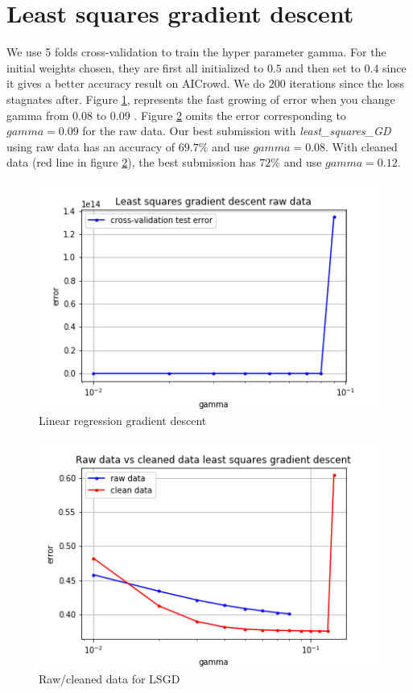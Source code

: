 \documentclass[11pt, a4paper, twocolumn]{article}
\begin{document}
\section{Least squares gradient descent}
We use 5 folds cross-validation
to train the hyper parameter gamma.
For the initial weights chosen, they are first all initialized to $0.5$ and then set to $0.4$ 
since it gives a better accuracy result on AICrowd.
We do $200$ iterations since the loss stagnates after.
Figure \ref{fig:lsgd}, 
represents the fast growing of error 
when you change gamma from $0.08$ to $0.09$ .
Figure \ref{fig:raw_clean_lsgd} omits the error corresponding to $gamma = 0.09$ for the raw data.
Our best submission with \textit{least\_squares\_GD} using raw data 
has an accuracy of $69.7\%$ and use $gamma = 0.08$.
With cleaned data (red line in figure \ref{fig:raw_clean_lsgd}), 
the best submission has $72\%$ and use $gamma = 0.12$.

\begin{figure}[h!]
  \includegraphics[width=\linewidth]{raw_data_least_squares_GD.png}
  \caption{Linear regression gradient descent}
  \label{fig:lsgd}
\end{figure}
\begin{figure}[h!]
  \includegraphics[width=\linewidth]{raw_vs_clean_lsgd.png}
  \caption{Raw/cleaned data for LSGD}
    \label{fig:raw_clean_lsgd}
\end{figure}
\end{document}
